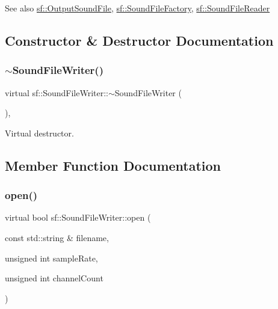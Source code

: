 \begin{DoxySeeAlso}{See also}
\mbox{\hyperlink{classsf_1_1_output_sound_file}{sf\+::\+Output\+Sound\+File}}, \mbox{\hyperlink{classsf_1_1_sound_file_factory}{sf\+::\+Sound\+File\+Factory}}, \mbox{\hyperlink{classsf_1_1_sound_file_reader}{sf\+::\+Sound\+File\+Reader}} \begin{DoxyVerb}\end{DoxyVerb}
 
\end{DoxySeeAlso}


\subsection{Constructor \& Destructor Documentation}
\mbox{\label{classsf_1_1_sound_file_writer_a76944fc158688f35050bd5b592c90270}} 
\subsubsection{\texorpdfstring{$\sim$SoundFileWriter()}{~SoundFileWriter()}}
{\footnotesize\ttfamily virtual sf\+::\+Sound\+File\+Writer\+::$\sim$\+Sound\+File\+Writer (\begin{DoxyParamCaption}{ }\end{DoxyParamCaption})\hspace{0.3cm}{\ttfamily [inline]}, {\ttfamily [virtual]}}



Virtual destructor. 

\begin{DoxyVerb}\end{DoxyVerb}
 

\subsection{Member Function Documentation}
\mbox{\label{classsf_1_1_sound_file_writer_a5c92bcaaa880ef4d3eaab18dae1d3d07}} 
\subsubsection{\texorpdfstring{open()}{open()}}
{\footnotesize\ttfamily virtual bool sf\+::\+Sound\+File\+Writer\+::open (\begin{DoxyParamCaption}\item[{const std\+::string \&}]{filename,  }\item[{unsigned int}]{sample\+Rate,  }\item[{unsigned int}]{channel\+Count }\end{DoxyParamCaption})\hspace{0.3cm}{\ttfamily [pure virtual]}}



